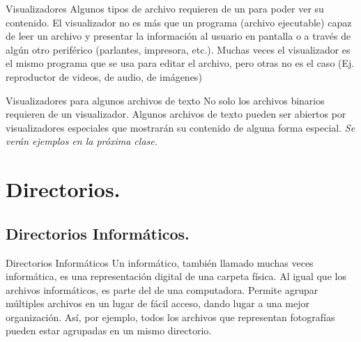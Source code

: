 
\begin{frame}{Visualizadores}
  Algunos tipos de archivo requieren de un  para poder ver
  su contenido.
  \jump
  El visualizador no es más que un programa (archivo ejecutable) capaz de leer un
  archivo y presentar la información al usuario en pantalla o a través de algún
  otro periférico (parlantes, impresora, etc.).
  \jump
  Muchas veces el visualizador es el mismo programa que se usa para editar el
  archivo, pero otras no es el caso (Ej. reproductor de videos, de audio, de
  imágenes)
\end{frame}


\begin{frame}{Visualizadores para algunos archivos de texto}
  No solo los archivos binarios requieren de un visualizador. Algunos archivos de
  texto pueden ser abiertos por visualizadores especiales que mostrarán su
  contenido de alguna forma especial.
  \jump
  \textit{Se verán ejemplos en la próxima clase.}
\end{frame}


\section{Directorios.}
\subsection{Directorios Informáticos.}


\begin{frame}{Directorios Informáticos}
  Un  informático, también llamado muchas veces
   informática, es una representación digital de una carpeta
  física.
  \jump
  Al igual que los archivos informáticos, es parte del  de una
  computadora.
  \jump
  Permite agrupar múltiples archivos en un lugar de fácil acceso, dando lugar
  a una mejor organización.
  \jump
  Así, por ejemplo, todos los archivos que representan fotografías pueden estar
  agrupadas en un mismo directorio.
\end{frame}

